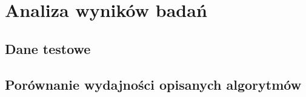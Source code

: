 \chapter{Analiza wyników badań}
\label{results}
\section{Dane testowe}
\section{Porównanie wydajności opisanych algorytmów}